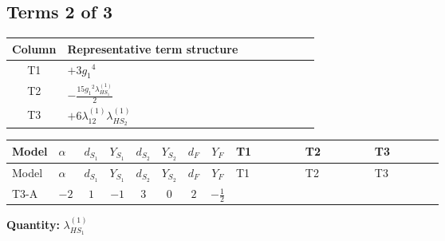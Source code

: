 \documentclass[8pt]{article}
\begin{document}
\begin{landscape}
\subsection*{Terms 2 of 3}
\begin{center}
\begin{tabular}{@{}c >{\raggedright\arraybackslash}p{0.82\linewidth}@{}}
\toprule
Column & Representative term structure \\
\midrule
T1 & \(\displaystyle +3 {g_1}^4\) \\
\midrule
T2 & \(\displaystyle -\frac{15 {g_1}^2 {\lambda_{HS_1}^{(1)}}}{2}\) \\
\midrule
T3 & \(\displaystyle +6 {\lambda_{12}^{(1)}} {\lambda_{HS_2}^{(1)}}\) \\
\midrule
\bottomrule
\end{tabular}
\end{center}
\smallskip
\tiny
\begin{longtable}{@{}llcccccc >{\raggedright\arraybackslash}p{0.21\linewidth} >{\raggedright\arraybackslash}p{0.21\linewidth} >{\raggedright\arraybackslash}p{0.21\linewidth}@{}}
\toprule
Model & $\alpha$ & $d_{S_1}$ & $Y_{S_1}$ & $d_{S_2}$ & $Y_{S_2}$ & $d_F$ & $Y_F$ & T1 & T2 & T3 \\
\midrule
\endfirsthead
\toprule
Model & $\alpha$ & $d_{S_1}$ & $Y_{S_1}$ & $d_{S_2}$ & $Y_{S_2}$ & $d_F$ & $Y_F$ & T1 & T2 & T3 \\
\midrule
\endhead
T3-A & $-2$ & $1$ & $-1$ & $3$ & $0$ & $2$ & $-\frac{1}{2}$ & \scriptsize\adjustbox{max width=\linewidth}{$\begin{gathered} +3 {g_1}^4\end{gathered}$} & \scriptsize\adjustbox{max width=\linewidth}{$\begin{gathered} -\frac{15 {g_1}^2 {\lambda_{HS_1}^{(1)}}}{2}\end{gathered}$} & \scriptsize\adjustbox{max width=\linewidth}{$\begin{gathered} +6 {\lambda_{12}^{(1)}} {\lambda_{HS_2}^{(1)}}\end{gathered}$} \\
\midrule
\bottomrule
\end{longtable}
\clearpage
\noindent\textbf{Quantity: }$\lambda_{HS_1}^{(1)}$\par\smallskip

\end{landscape}
\end{document}
